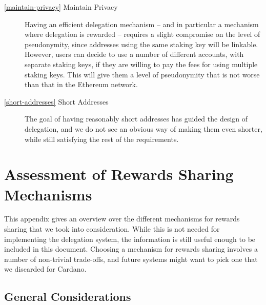 \documentclass[11pt,a4paper]{article}
\begin{document}
\begin{description}
\item[\cref{maintain-privacy} Maintain Privacy] Having an efficient
  delegation mechanism -- and in particular a mechanism where
  delegation is rewarded -- requires a slight compromise on the level
  of pseudonymity, since addresses using the same staking key will be
  linkable. However, users can decide to use a number of different
  accounts, with separate staking keys, if they are willing to pay the
  fees for using multiple staking keys. This will give them a level of
  pseudonymity that is not worse than that in the Ethereum network.

\item[\cref{short-addresses} Short Addresses] The goal of having
  reasonably short addresses has guided the design of delegation, and
  we do not see an obvious way of making them even shorter, while
  still satisfying the rest of the requirements.

\end{description}

\appendix

\section{Assessment of Rewards Sharing Mechanisms}
\label{assessment-of-rewards-sharing-mechanisms}

This appendix gives an overview over the different mechanisms for
rewards sharing that we took into consideration. While this is not
needed for implementing the delegation system, the information is
still useful enough to be included in this document. Choosing a
mechanism for rewards sharing involves a number of non-trivial
trade-offs, and future systems might want to pick one that we
discarded for Cardano.

\subsection{General Considerations}
\label{general-considerations}
\end{document}
